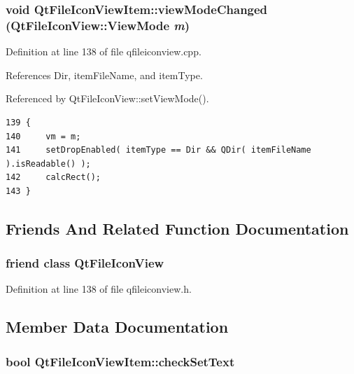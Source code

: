 \subsubsection{\setlength{\rightskip}{0pt plus 5cm}void Qt\-File\-Icon\-View\-Item::view\-Mode\-Changed ({\bf Qt\-File\-Icon\-View::View\-Mode} {\em m})}\label{classQtFileIconViewItem_QtFileIconViewItema9}




Definition at line 138 of file qfileiconview.cpp.

References Dir, item\-File\-Name, and item\-Type.

Referenced by Qt\-File\-Icon\-View::set\-View\-Mode().



\footnotesize\begin{verbatim}139 {
140     vm = m;
141     setDropEnabled( itemType == Dir && QDir( itemFileName ).isReadable() );
142     calcRect();
143 }
\end{verbatim}\normalsize 


\subsection{Friends And Related Function Documentation}
\subsubsection{\setlength{\rightskip}{0pt plus 5cm}friend class {\bf Qt\-File\-Icon\-View}\hspace{0.3cm}{\tt  [friend]}}\label{classQtFileIconViewItem_QtFileIconViewItemn0}




Definition at line 138 of file qfileiconview.h.

\subsection{Member Data Documentation}
\subsubsection{\setlength{\rightskip}{0pt plus 5cm}bool {\bf Qt\-File\-Icon\-View\-Item::check\-Set\-Text}\hspace{0.3cm}{\tt  [protected]}}\label{classQtFileIconViewItem_QtFileIconViewItemp3}




